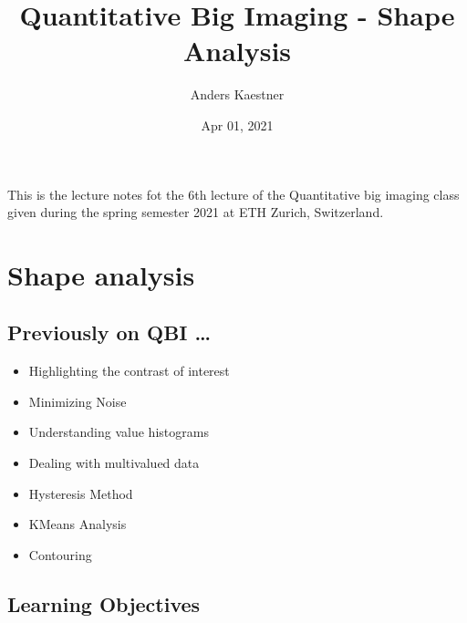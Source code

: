 \documentclass[letterpaper,10pt,english]{sphinxmanual}
\title{Quantitative Big Imaging - Shape Analysis}
\date{Apr 01, 2021}
\author{Anders Kaestner}
\begin{document}
\pagestyle{empty}
\sphinxmaketitle
\pagestyle{plain}
\sphinxtableofcontents
\pagestyle{normal}
\label{\detokenize{preface::doc}}


\sphinxAtStartPar
This is the lecture notes fot the 6th lecture of the Quantitative big imaging class given during the spring semester 2021 at ETH Zurich, Switzerland.


\chapter{Shape analysis}
\label{\detokenize{06-ShapeAnalysis:shape-analysis}}\label{\detokenize{06-ShapeAnalysis::doc}}





\section{Previously on QBI …}
\label{\detokenize{06-ShapeAnalysis:previously-on-qbi}}

\begin{itemize}
\item {} 
\sphinxAtStartPar
Highlighting the contrast of interest

\item {} 
\sphinxAtStartPar
Minimizing Noise



\item {} 
\sphinxAtStartPar
Understanding value histograms

\item {} 
\sphinxAtStartPar
Dealing with multi\sphinxhyphen{}valued data



\item {} 
\sphinxAtStartPar
Hysteresis Method

\item {} 
\sphinxAtStartPar
K\sphinxhyphen{}Means Analysis



\item {} 
\sphinxAtStartPar
Contouring



\end{itemize}


\section{Learning Objectives}
\label{\detokenize{06-ShapeAnalysis:learning-objectives}}
\end{document}
